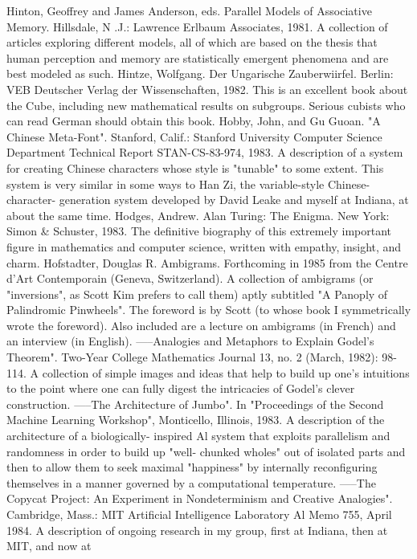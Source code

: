 Hinton, Geoffrey and James Anderson, eds. Parallel Models of Associative Memory.
  Hillsdale, N .J.: Lawrence Erlbaum Associates, 1981. A collection of articles exploring
  different models, all of which are based on the thesis that human perception and memory
  are statistically emergent phenomena and are best modeled as such.
Hintze, Wolfgang. Der Ungarische Zauberwiirfel. Berlin: VEB Deutscher Verlag der
  Wissenschaften, 1982. This is an excellent book about the Cube, including new
  mathematical results on subgroups. Serious cubists who can read German should obtain this
  book.
Hobby, John, and Gu Guoan. "A Chinese Meta-Font". Stanford, Calif.: Stanford University
  Computer Science Department Technical Report STAN-CS-83-974, 1983. A description of
  a system for creating Chinese characters whose style is "tunable" to some extent. This
  system is very similar in some ways to Han Zi, the variable-style Chinese-character-
  generation system developed by David Leake and myself at Indiana, at about the same time.
Hodges, Andrew. Alan Turing: The Enigma. New York: Simon \& Schuster, 1983. The
  definitive biography of this extremely important figure in mathematics and computer
  science, written with empathy, insight, and charm.
Hofstadter, Douglas R. Ambigrams. Forthcoming in 1985 from the Centre d'Art
  Contemporain (Geneva, Switzerland). A collection of ambigrams (or "inversions", as Scott
  Kim prefers to call them) aptly subtitled "A Panoply of Palindromic Pinwheels". The
  foreword is by Scott (to whose book I symmetrically wrote the foreword). Also included are
  a lecture on ambigrams (in French) and an interview (in English).
-----Analogies and Metaphors to Explain Godel's Theorem". Two-Year College Mathematics
  Journal 13, no. 2 (March, 1982): 98-114. A collection of simple images and ideas that help
  to build up one's intuitions to the point where one can fully digest the intricacies of Godel's
  clever construction.
-----The Architecture of Jumbo". In "Proceedings of the Second Machine Learning
  Workshop", Monticello, Illinois, 1983. A description of the architecture of a biologically-
  inspired Al system that exploits parallelism and randomness in order to build up "well-
  chunked wholes" out of isolated parts and then to allow them to seek maximal "happiness"
  by internally reconfiguring themselves in a manner governed by a computational
  temperature.
-----The Copycat Project: An Experiment in Nondeterminism and Creative Analogies".
  Cambridge, Mass.: MIT Artificial Intelligence Laboratory Al Memo 755, April 1984. A
  description of ongoing research in my group, first at Indiana, then at MIT, and now at
